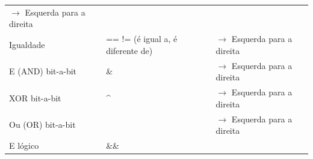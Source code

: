 \documentclass[12pt,a4paper]{article}
\begin{document}
\begin{longtable}[]{@{}lll@{}}
\begin{minipage}[t]{0.21\columnwidth}
\(\rightarrow\) Esquerda para a direita\strut
\end{minipage}\tabularnewline
\begin{minipage}[t]{0.26\columnwidth}\raggedright
Igualdade\strut
\end{minipage} & \begin{minipage}[t]{0.44\columnwidth}\raggedright
== != (é igual a, é diferente de)\strut
\end{minipage} & \begin{minipage}[t]{0.21\columnwidth}\raggedright
\(\rightarrow\) Esquerda para a direita\strut
\end{minipage}\tabularnewline
\begin{minipage}[t]{0.26\columnwidth}\raggedright
E (AND) bit-a-bit\strut
\end{minipage} & \begin{minipage}[t]{0.44\columnwidth}\raggedright
\&\strut
\end{minipage} & \begin{minipage}[t]{0.21\columnwidth}\raggedright
\(\rightarrow\) Esquerda para a direita\strut
\end{minipage}\tabularnewline
\begin{minipage}[t]{0.26\columnwidth}\raggedright
XOR bit-a-bit\strut
\end{minipage} & \begin{minipage}[t]{0.44\columnwidth}\raggedright
\^{}\strut
\end{minipage} & \begin{minipage}[t]{0.21\columnwidth}\raggedright
\(\rightarrow\) Esquerda para a direita\strut
\end{minipage}\tabularnewline
\begin{minipage}[t]{0.26\columnwidth}\raggedright
Ou (OR) bit-a-bit\strut
\end{minipage} & \begin{minipage}[t]{0.44\columnwidth}\raggedright
\textbar{}\strut
\end{minipage} & \begin{minipage}[t]{0.21\columnwidth}\raggedright
\(\rightarrow\) Esquerda para a direita\strut
\end{minipage}\tabularnewline
\begin{minipage}[t]{0.26\columnwidth}\raggedright
E lógico\strut
\end{minipage} & \begin{minipage}[t]{0.44\columnwidth}\raggedright
\&\&\strut
\end{minipage} & \begin{minipage}[t]{0.21\columnwidth}\raggedright

\end{minipage}
\end{longtable}
\end{document}
